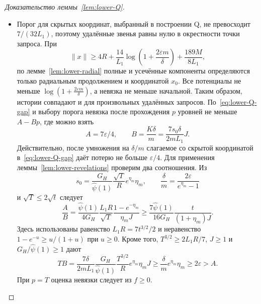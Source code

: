 \begin{proof}[Доказательство леммы~\ref{lem:lower-Q}]
\begin{itemize}
Если раскрыты первые $p<T$ координат и модуль следующей координаты
меньше выбранного порога, то сумма разностей
$R/\sqrt T-x_{c(0)}$ и $x_{c(j-1)}-x_{c(j)}$, $1\le j\le p$,
равна $R/\sqrt T-x_{c(p)}$.
Касательная к $\phi_0$ и~\eqref{eq:lower-conjugate} дают
\begin{equation}\label{eq:lower-Q-gap}
 \begin{aligned}
 &\phi_0(R/\sqrt T-x_{c(0)})+\sum_{j=1}^p\phi(x_{c(j-1)}-x_{c(j)})\\
 &\quad\ge\frac{2\varepsilon m}{\delta}-s_0x_{c(p)}-pK.
 \end{aligned}
\end{equation}
Инъективность $\pi$ позволяет оценить среднюю функцию снизу суммой
этих экспоненциальных звеньев: пустая пара даёт неотрицательный вклад,
а пара со звеном $j$ даёт не меньше $(\delta/m)\phi(x_{c(j-1)}-x_{c(j)})$.

\item Порог для скрытых координат, выбранный в построении Q,
не превосходит $7/(32L_1)$, поэтому
удалённые звенья равны нулю в окрестности точки запроса.
При
\[
 \|x\|\ge4R+\frac{14}{L_1}\log\!\left(1+\frac{2\varepsilon m}{\delta}\right)+\frac{189M}{8L_1},
\]
по лемме~\ref{lem:lower-radial} полные и усечённые компоненты определяются только радиальным продолжением
и координатой $x_0$. Все потенциалы не меньше $\log\!\left(1+\frac{2\varepsilon m}{\delta}\right)$, а невязка
не меньше начальной. Таким образом, истории совпадают
и для произвольных удалённых запросов.
По~\eqref{eq:lower-Q-gap} и выбору порога невязка после
прохождения $p$ уровней не меньше $A-Bp$, где можно взять
\[
 A=7\varepsilon/4,\qquad
 B=\frac{K\delta}{m}=\frac{7s_0\delta}{2mL_1}J.
\]
Действительно, после умножения на $\delta/m$ слагаемое со скрытой координатой
в~\eqref{eq:lower-Q-gap} даёт потерю не больше $\varepsilon/4$.
Для применения леммы~\ref{lem:lower-revelations} проверим два соотношения.
Из
\[
 s_0=\frac{G_H}{\widehat\psi(1)}\frac{\sqrt T}{R}e^{\eta_m}\eta_m,
 \qquad \frac{\delta}{m}=\frac{2\varepsilon}{e^{\eta_m}-1}
\]
и $\sqrt T\le2\sqrt t$ следует
\begin{equation}\label{eq:lower-Q-ratio}
 \frac AB
 =\frac{\widehat\psi(1)}{4G_H}
   \frac{L_1R}{\sqrt T}\frac{1-e^{-\eta_m}}{\eta_m J}
 \ge\frac{7\widehat\psi(1)}{16G_H}
      \frac{t}{(1+\eta_m)J}.
\end{equation}
Здесь использованы равенство $L_1R=7t^{3/2}/2$ и неравенство
$1-e^{-u}\ge u/(1+u)$ при $u\ge0$.
Кроме того, $T^{3/2}\ge2L_1R/7$, $J\ge1$ и
$G_H/\widehat\psi(1)\ge1$ дают
\[
 TB=\frac{7\delta}{2mL_1}\frac{G_H}{\widehat\psi(1)}
       \frac{T^{3/2}}R e^{\eta_m}\eta_m J
 \ge\frac\delta m e^{\eta_m}\eta_m
 \ge2\varepsilon>A.
\]
При $p=T$ оценка невязки следует из $f\ge0$.


\end{itemize}
\end{proof}
